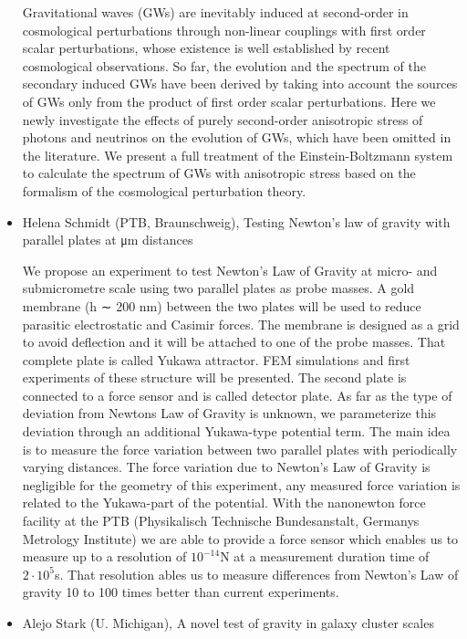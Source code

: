 \documentclass[letterpaper,12pt]{article}
\newcommand{\talk}[2]{{\fontspec{Lato Bold} #1,} {\fontspec{Lato Light Italic} #2}}
\begin{document}
\begin{itemize}
Gravitational waves (GWs) are inevitably induced at second-order in cosmological perturbations through non-linear couplings with first order scalar perturbations, whose existence is well established by recent cosmological observations. So far, the evolution and the spectrum of the secondary induced GWs have been derived by taking into account the sources of GWs only from the product of first order scalar perturbations. Here we newly investigate the effects of purely second-order anisotropic stress of photons and neutrinos on the evolution of GWs, which have been omitted in the literature. We present a full treatment of the Einstein-Boltzmann system to calculate the spectrum of GWs with anisotropic stress based on the formalism of the cosmological perturbation theory.

\item \talk{Helena Schmidt (PTB, Braunschweig)}{Testing Newton's law of gravity with parallel plates at μm distances}

We propose an experiment to test Newton's Law of Gravity at micro- and submicrometre scale using two parallel plates as probe masses. A gold membrane (h ∼ 200 nm) between the two plates will be used to reduce parasitic electrostatic and Casimir forces. The membrane is designed as a grid to avoid deflection and it will be attached to one of the probe masses. That complete plate is called Yukawa attractor. FEM simulations and first experiments of these structure will be presented. The second plate is connected to a force sensor and is called detector plate. As far as the type of deviation from Newtons Law of Gravity is unknown, we parameterize this deviation through an additional Yukawa-type potential term. The main idea is to measure the force variation between two parallel plates with periodically varying distances. The force variation due to Newton's Law of Gravity is negligible for the geometry of this experiment, any measured force variation is related to the Yukawa-part of the potential. With the nanonewton force facility at the PTB (Physikalisch Technische Bundesanstalt, Germanys Metrology Institute) we are able to provide a force sensor which enables us to measure up to a resolution of $10^{-14}$N at a measurement duration time of $2·10^5$s. That resolution ables us to measure differences from Newton's Law of gravity 10 to 100 times better than current experiments.

\item \talk{Alejo Stark (U. Michigan)}{A novel test of gravity in galaxy cluster scales}


\end{itemize}
\end{document}
